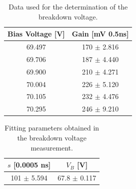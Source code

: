 \documentclass[10pt,a4paper]{article}
\begin{document}
\begin{table}[H]
\centering
\caption{Data used for the determination of the breakdown voltage.}
\begin{tabular}{|c|c|}
\hline 
Bias Voltage [V] & Gain [mV 0.5ns] \\ 
\hline 
69.497 & 170 $\pm$ 2.816 \\ 
\hline 
69.706 & 187 $\pm$ 4.440 \\ 
\hline 
69.900 & 210 $\pm$ 4.271\\ 
\hline 
70.004 & 226 $\pm$ 5.120\\ 
\hline 
70.105 & 232 $\pm$ 4.476\\ 
\hline 
70.295 & 246 $\pm$ 9.210\\ 
\hline 
\end{tabular} 
\label{Table 1}
\end{table}
\begin{table}[H]
\centering
\caption{Fitting parameters obtained in the breakdown voltage measurement.}
\begin{tabular}{|c|c|}
\hline 
 $s$ [0.0005 ns]  & $V_B$ [V] \\ 
\hline 
101 $\pm$ 5.594 & 67.8 $\pm$ 0.117 \\ 
\hline 
\end{tabular} 
\label{Table 2}
\end{table}
\end{document}

